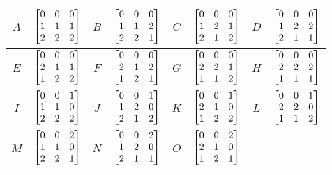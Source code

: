 \documentclass[11pt, oneside, dvipdfmx]{book}
\begin{document}
\begin{table}[h!]
\centering
\begin{tabular}{|c || c | c|| c|c || c | c|| c|} 
 \hline
 $A$ & $ \begin{bmatrix}0 & 0 & 0\cr1 & 1 & 1\cr2 & 2 & 2\end{bmatrix}$ 
 &
  $B$ & $\begin{bmatrix} 0 & 0 & 0 \cr 1 & 1 & 2 \cr 2 & 2 & 1\end{bmatrix}$ 
  &
  $C$ &$\begin{bmatrix} 0 & 0 & 0 \cr 1 & 2 & 1 \cr 2 & 1 & 2\end{bmatrix}$
  &
  $D$ & $\begin{bmatrix}0 & 0 & 0 \cr 1 & 2 & 2 \cr 2 & 1 & 1\end{bmatrix}$\\
 \hline
  $E$ & $\begin{bmatrix}0 & 0 & 0 \cr 2 & 1 & 1 \cr 1 & 2 & 2\end{bmatrix}$ 
 &
 $F$ & $\begin{bmatrix}0 & 0 & 0 \cr 2 & 1 & 2 \cr 1 & 2 & 1\end{bmatrix}$ 
 &
  $G$ & $\begin{bmatrix}0 & 0 & 0 \cr 2 & 2 & 1 \cr 1 & 1 & 2\end{bmatrix}$ 
 &
  $H$ & $\begin{bmatrix} 0 & 0 & 0\cr 2 & 2 & 2\cr 1 & 1 & 1\end{bmatrix}$\\ 
 \hline
   $I$ & $\begin{bmatrix} 0 & 0 & 1 \cr 1 & 1 & 0 \cr 2 & 2 & 2\end{bmatrix}$
 &
  $J$ & $\begin{bmatrix}0 & 0 & 1 \cr 1 & 2 & 0 \cr 2 & 1 & 2\end{bmatrix}$ 
 &
  $K$ & $\begin{bmatrix}0 & 0 & 1 \cr 2 & 1 & 0 \cr 1 & 2 & 2 \end{bmatrix}$
 &
 $L$ & $\begin{bmatrix}0 & 0 & 1 \cr 2 & 2 & 0 \cr 1 & 1 & 2\end{bmatrix}$\\ 
 \hline
 $M$ & $\begin{bmatrix}0 & 0 & 2 \cr 1 & 1 & 0 \cr 2 & 2 & 1 \end{bmatrix}$
 &
  $N$ & $\begin{bmatrix}0 & 0 & 2 \cr 1 & 2 & 0 \cr 2 & 1 & 1 \end{bmatrix}$ 
 &
 $O$ & $\begin{bmatrix}0 & 0 & 2 \cr 2 & 1 & 0 \cr 1 & 2 & 1\end{bmatrix}$ 

\end{tabular}
\end{table}
\end{document}
